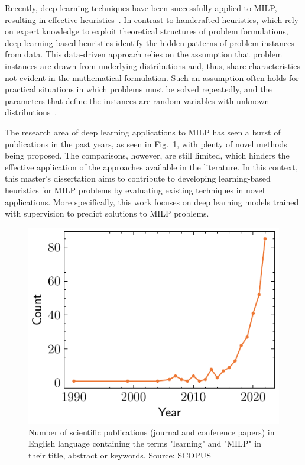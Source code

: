 Recently, deep learning techniques have been successfully applied to MILP, resulting in effective heuristics~\cite{nairSolvingMixedInteger2021,gasseMachineLearningCombinatorial2022,larsenPredictingTacticalSolutions2022,khalilMIPGNNDataDrivenFramework2022,hanGNNGuidedPredictandSearchFramework2023}.
In contrast to handcrafted heuristics, which rely on expert knowledge to exploit theoretical structures of problem formulations, deep learning-based heuristics identify the hidden patterns of problem instances from data.
This data-driven approach relies on the assumption that problem instances are drawn from underlying distributions and, thus, share characteristics not evident in the mathematical formulation.
Such an assumption often holds for practical situations in which problems must be solved repeatedly, and the parameters that define the instances are random variables with unknown distributions~\cite{bengioMachineLearningCombinatorial2021}.

The research area of deep learning applications to MILP has seen a burst of publications in the past years, as seen in Fig.~\ref{fig:scopus-trend}, with plenty of novel methods being proposed.
The comparisons, however, are still limited, which hinders the effective application of the approaches available in the literature.
In this context, this master’s dissertation aims to contribute to developing learning-based heuristics for MILP problems by evaluating existing techniques in novel applications.
More specifically, this work focuses on deep learning models trained with supervision to predict solutions to MILP problems.

\begin{figure}[h]
    \centering
    \includegraphics{pictures/scopus.pdf}
    \caption{Number of scientific publications (journal and conference papers) in English language containing the terms "learning" and "MILP" in their title, abstract or keywords. Source: SCOPUS}
    \label{fig:scopus-trend}
\end{figure}

